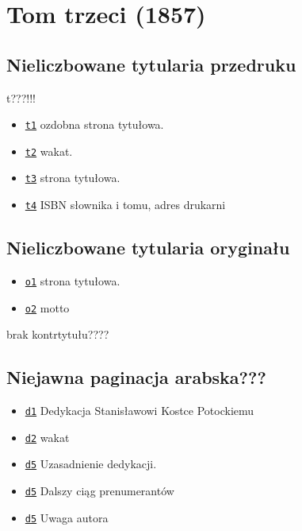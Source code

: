 \documentclass[12]{mwart}
\begin{document}
\section{Tom trzeci  (1857)}
\label{sec:tom-trzeci}

\subsection{Nieliczbowane tytularia przedruku}
\label{sec:niel-tytul-przedr-2}

\newcommand{\paiii}[2]{http://teksty.klf.uw.edu.pl/20/10/LindeIIGP#1ocri.djvu?djvuopts=\&page=#2\&zoom=page}

t???!!!

\begin{itemize}
\item \href{\paiii{3}{1}}{\texttt{t1}} ozdobna strona tytułowa.
\item \href{\paiii{3}{2}}{\texttt{t2}} wakat.
\item \href{\paiii{3}{3}}{\texttt{t3}} strona tytułowa.
\item \href{\paiii{3}{4}}{\texttt{t4}} ISBN słownika i tomu, adres drukarni
\end{itemize}

\subsection{Nieliczbowane tytularia oryginału}
\label{sec:niel-tytul-oryg-1}

\begin{itemize}
\item \href{\paiii{3}{5}}{\texttt{o1}}  strona tytułowa.
\item \href{\paiii{3}{6}}{\texttt{o2}}  motto
\end{itemize}

brak kontrtytułu????

\subsection{Niejawna paginacja arabska???}
\label{sec:niej-pagin-arabska}

\begin{itemize}
\item \href{\paiii{3}{7}}{\texttt{d1}} Dedykacja Stanisławowi Kostce Potockiemu
\item \href{\paiii{3}{8}}{\texttt{d2}} wakat
\item \href{\paiii{3}{9}}{\texttt{d5}} Uzasadnienie dedykacji.
\item \href{\paiii{3}{13}}{\texttt{d5}} Dalszy ciąg prenumerantów
\item \href{\paiii{3}{14}}{\texttt{d5}} Uwaga autora
\end{itemize}
\end{document}
